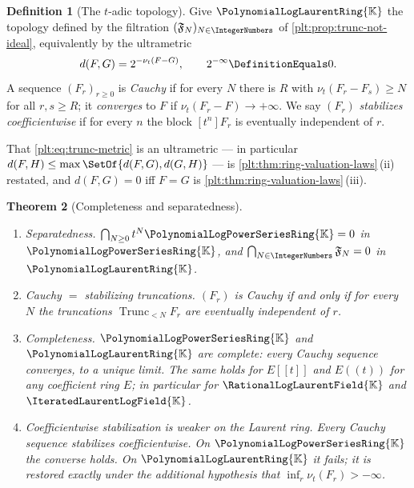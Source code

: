 \documentclass[11pt,oneside]{article}
\theoremstyle{plain}
\newtheorem{theorem}{Theorem}[section]
\theoremstyle{definition}
\newtheorem{definition}[theorem]{Definition}
\theoremstyle{remark}
\newcommand{\K}{\mathbb{K}}
\newcommand{\PLpow}{\PolynomialLogPowerSeriesRing{\K}}   %
\newcommand{\PLlau}{\PolynomialLogLaurentRing{\K}}       %
\newcommand{\PLrat}{\RationalLogLaurentField{\K}}        %
\newcommand{\PLit}{\IteratedLaurentLogField{\K}}         %
\newcommand{\ordt}{\nu_{t}}                              %
\newcommand{\Trunc}[2]{\operatorname{Trunc}_{<#2}#1}     %
\begin{document}
\begin{definition}[The \(t\)-adic topology]
\label{plt:def:trunc-topology}
Give \(\PLlau\) the topology defined by the filtration
\((\mathfrak F_N)_{N\in\IntegerNumbers}\) of
\cref{plt:prop:trunc-not-ideal}, equivalently by the ultrametric
\begin{equation}\label{plt:eq:trunc-metric}
  d(F,G)=2^{-\ordt(F-G)},
  \qquad 2^{-\infty}\DefinitionEquals0 .
\end{equation}
A sequence \((F_r)_{r\ge0}\) is \emph{Cauchy} if for every \(N\) there is
\(R\) with \(\ordt(F_r-F_s)\ge N\) for all \(r,s\ge R\); it \emph{converges}
to \(F\) if \(\ordt(F_r-F)\to+\infty\).  We say \((F_r)\) \emph{stabilizes
coefficientwise} if for every \(n\) the block \([t^n]F_r\) is eventually
independent of \(r\).
\end{definition}

That \eqref{plt:eq:trunc-metric} is an ultrametric --- in particular
\(d(F,H)\le\max\SetOf{d(F,G),d(G,H)}\) --- is
\cref{plt:thm:ring-valuation-laws}\,(ii) restated, and \(d(F,G)=0\) iff
\(F=G\) is \cref{plt:thm:ring-valuation-laws}\,(iii).

\begin{theorem}[Completeness and separatedness]
\label{plt:thm:trunc-completeness}
\begin{enumerate}[label=\textup{(\roman*)}]
\item \emph{Separatedness.}  \(\bigcap_{N\ge0}t^N\PLpow=0\) in \(\PLpow\), and
  \(\bigcap_{N\in\IntegerNumbers}\mathfrak F_N=0\) in \(\PLlau\).
\item \emph{Cauchy \(=\) stabilizing truncations.}  \((F_r)\) is Cauchy if and
  only if for every \(N\) the truncations \(\Trunc{F_r}{N}\) are eventually
  independent of \(r\).
\item \emph{Completeness.}  \(\PLpow\) and \(\PLlau\) are complete: every
  Cauchy sequence converges, to a unique limit.  The same holds for
  \(E[[t]]\) and \(E((t))\) for any coefficient ring \(E\); in particular for
  \(\PLrat\) and \(\PLit\).
\item \emph{Coefficientwise stabilization is weaker on the Laurent ring.}
  Every Cauchy sequence stabilizes coefficientwise.  On \(\PLpow\) the
  converse holds.  On \(\PLlau\) it fails; it is restored exactly under the
  additional hypothesis that \(\inf_r\ordt(F_r)>-\infty\).
\end{enumerate}
\end{theorem}
\end{document}
